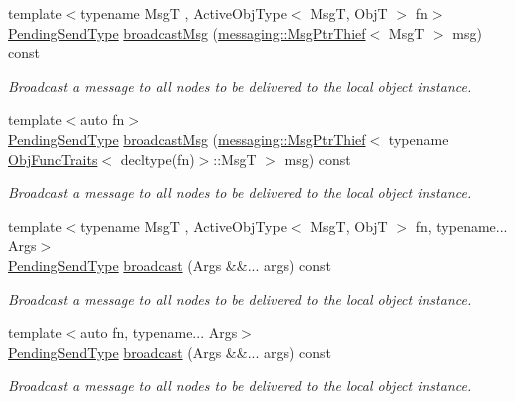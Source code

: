 \begin{DoxyCompactItemize}
{\footnotesize template$<$typename MsgT , Active\+Obj\+Type$<$ Msg\+T, Obj\+T $>$ fn$>$ }\\\hyperlink{structvt_1_1objgroup_1_1proxy_1_1_proxy_a1bdf8713203531d306702a024872bb08}{Pending\+Send\+Type} \hyperlink{structvt_1_1objgroup_1_1proxy_1_1_proxy_a7006ef75ce5ab6b1c8f28c62f72b81a6}{broadcast\+Msg} (\hyperlink{structvt_1_1messaging_1_1_msg_ptr_thief}{messaging\+::\+Msg\+Ptr\+Thief}$<$ MsgT $>$ msg) const
\begin{DoxyCompactList}\small\item\em Broadcast a message to all nodes to be delivered to the local object instance. \end{DoxyCompactList}\item 
{\footnotesize template$<$auto fn$>$ }\\\hyperlink{structvt_1_1objgroup_1_1proxy_1_1_proxy_a1bdf8713203531d306702a024872bb08}{Pending\+Send\+Type} \hyperlink{structvt_1_1objgroup_1_1proxy_1_1_proxy_a698e8e08cbcae5d69f3ad6ae51f10862}{broadcast\+Msg} (\hyperlink{structvt_1_1messaging_1_1_msg_ptr_thief}{messaging\+::\+Msg\+Ptr\+Thief}$<$ typename \hyperlink{structvt_1_1_obj_func_traits}{Obj\+Func\+Traits}$<$ decltype(fn)$>$\+::MsgT $>$ msg) const
\begin{DoxyCompactList}\small\item\em Broadcast a message to all nodes to be delivered to the local object instance. \end{DoxyCompactList}\item 
{\footnotesize template$<$typename MsgT , Active\+Obj\+Type$<$ Msg\+T, Obj\+T $>$ fn, typename... Args$>$ }\\\hyperlink{structvt_1_1objgroup_1_1proxy_1_1_proxy_a1bdf8713203531d306702a024872bb08}{Pending\+Send\+Type} \hyperlink{structvt_1_1objgroup_1_1proxy_1_1_proxy_ae4f7ac79675f035f8932e11143a4c4d3}{broadcast} (Args \&\&... args) const
\begin{DoxyCompactList}\small\item\em Broadcast a message to all nodes to be delivered to the local object instance. \end{DoxyCompactList}\item 
{\footnotesize template$<$auto fn, typename... Args$>$ }\\\hyperlink{structvt_1_1objgroup_1_1proxy_1_1_proxy_a1bdf8713203531d306702a024872bb08}{Pending\+Send\+Type} \hyperlink{structvt_1_1objgroup_1_1proxy_1_1_proxy_a2ea1ee920d73633a4c57f45298f9706f}{broadcast} (Args \&\&... args) const
\begin{DoxyCompactList}\small\item\em Broadcast a message to all nodes to be delivered to the local object instance. \end{DoxyCompactList}\item 

\end{DoxyCompactItemize}
